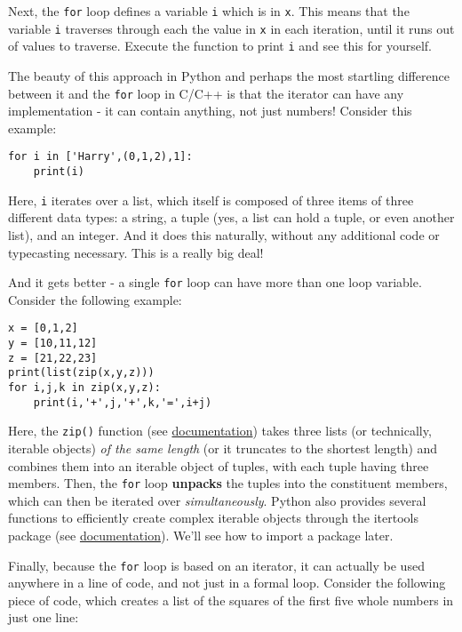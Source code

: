\documentclass[12pt]{article}
\newcommand{\code}{\texttt}
\begin{document}
Next, the \code{for} loop defines a variable \code{i} which is in \code{x}. This means that the variable \code{i} traverses through each the value in \code{x} in each iteration, until it runs out of values to traverse. Execute the function to print \code{i} and see this for yourself. 

The beauty of this approach in Python and perhaps the most startling difference between it and the \code{for} loop in C/C++ is that the iterator can have any implementation - it can contain anything, not just numbers! Consider this example:

\begin{lstlisting}[frame=single] 
for i in ['Harry',(0,1,2),1]:
    print(i)
\end{lstlisting}

Here, \code{i} iterates over a list, which itself is composed of three items of three different data types: a string, a tuple (yes, a list can hold a tuple, or even another list), and an integer. And it does this naturally, without any additional code or typecasting necessary. This is a really big deal!

And it gets better - a single \code{for} loop can have more than one loop variable. Consider the following example:

\begin{lstlisting}[frame=single] 
x = [0,1,2]
y = [10,11,12]
z = [21,22,23]
print(list(zip(x,y,z)))
for i,j,k in zip(x,y,z):
    print(i,'+',j,'+',k,'=',i+j)
\end{lstlisting}

Here, the \code{zip()} function (see \href{https://docs.python.org/3.3/library/functions.html#zip}{documentation}) takes three lists (or technically, iterable objects) \textit{of the same length} (or it truncates to the shortest length) and combines them into an iterable object of tuples, with each tuple having three members. Then, the \code{for} loop \textbf{unpacks} the tuples into the constituent members, which can then be iterated over \textit{simultaneously}. Python also provides several functions to efficiently create complex iterable objects through the itertools package (see \href{https://docs.python.org/3/library/itertools.html}{documentation}). We'll see how to import a package later.  

Finally, because the \code{for} loop is based on an iterator, it can actually be used anywhere in a line of code, and not just in a formal loop. Consider the following piece of code, which creates a list of the squares of the first five whole numbers in just one line:
\end{document}
